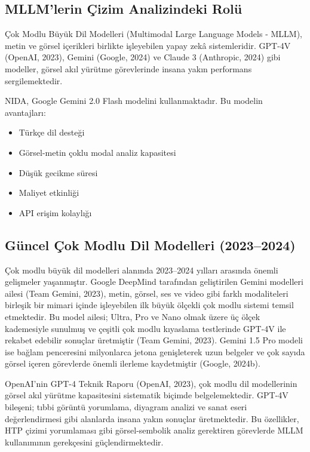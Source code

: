 \subsection{MLLM'lerin Çizim Analizindeki Rolü}

Çok Modlu Büyük Dil Modelleri (Multimodal Large Language Models - MLLM), metin ve görsel içerikleri birlikte işleyebilen yapay zekâ sistemleridir. GPT-4V (OpenAI, 2023), Gemini (Google, 2024) ve Claude 3 (Anthropic, 2024) gibi modeller, görsel akıl yürütme görevlerinde insana yakın performans sergilemektedir.

NIDA, Google Gemini 2.0 Flash modelini kullanmaktadır. Bu modelin avantajları:

\begin{itemize}
  \item Türkçe dil desteği
  \item Görsel-metin çoklu modal analiz kapasitesi
  \item Düşük gecikme süresi
  \item Maliyet etkinliği
  \item API erişim kolaylığı
\end{itemize}

\subsection{Güncel Çok Modlu Dil Modelleri (2023--2024)}

Çok modlu büyük dil modelleri alanında 2023--2024 yılları arasında önemli gelişmeler yaşanmıştır. Google DeepMind tarafından geliştirilen Gemini modelleri ailesi (Team Gemini, 2023), metin, görsel, ses ve video gibi farklı modaliteleri birleşik bir mimari içinde işleyebilen ilk büyük ölçekli çok modlu sistemi temsil etmektedir. Bu model ailesi; Ultra, Pro ve Nano olmak üzere üç ölçek kademesiyle sunulmuş ve çeşitli çok modlu kıyaslama testlerinde GPT-4V ile rekabet edebilir sonuçlar üretmiştir (Team Gemini, 2023). Gemini 1.5 Pro modeli ise bağlam penceresini milyonlarca jetona genişleterek uzun belgeler ve çok sayıda görsel içeren görevlerde önemli ilerleme kaydetmiştir (Google, 2024b).

OpenAI'nin GPT-4 Teknik Raporu (OpenAI, 2023), çok modlu dil modellerinin görsel akıl yürütme kapasitesini sistematik biçimde belgelemektedir. GPT-4V bileşeni; tıbbi görüntü yorumlama, diyagram analizi ve sanat eseri değerlendirmesi gibi alanlarda insana yakın sonuçlar üretmektedir. Bu özellikler, HTP çizimi yorumlaması gibi görsel-sembolik analiz gerektiren görevlerde MLLM kullanımının gerekçesini güçlendirmektedir.

